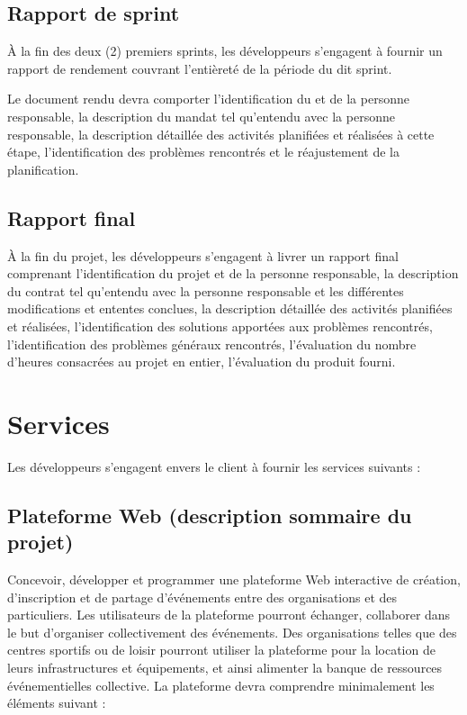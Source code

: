 \documentclass[letter,12pt]{exam}
\begin{document}
\subsection{Rapport de sprint}

À la fin des deux (2) premiers sprints, les développeurs s'engagent à fournir un
rapport de rendement couvrant l'entièreté de la période du dit sprint.

Le document rendu devra comporter l'identification du et de la personne
responsable, la description du mandat tel qu'entendu avec la personne
responsable, la description détaillée des activités planifiées et
réalisées à cette étape, l'identification des problèmes rencontrés et le
réajustement de la planification.

\subsection{Rapport final}

À la fin du projet, les développeurs s'engagent à livrer un rapport
final comprenant l'identification du projet et de la personne
responsable, la description du contrat tel qu'entendu avec la personne
responsable et les différentes modifications et ententes conclues, la
description détaillée des activités planifiées et réalisées,
l'identification des solutions apportées aux problèmes rencontrés,
l'identification des problèmes généraux rencontrés, l'évaluation du
nombre d'heures consacrées au projet en entier, l'évaluation du produit
fourni.

\section{Services}

Les développeurs s'engagent envers le client à fournir les services
suivants :

\subsection{Plateforme Web (description sommaire du
projet)}

Concevoir, développer et programmer une plateforme Web interactive de
création, d'inscription et de partage d'événements entre des
organisations et des particuliers. Les utilisateurs de la plateforme
pourront échanger, collaborer dans le but d'organiser collectivement des
événements. Des organisations telles que des centres sportifs ou de loisir
pourront utiliser la plateforme pour la location de leurs
infrastructures et équipements, et ainsi alimenter la banque de
ressources événementielles collective. La plateforme devra comprendre
minimalement les éléments suivant :
\end{document}
